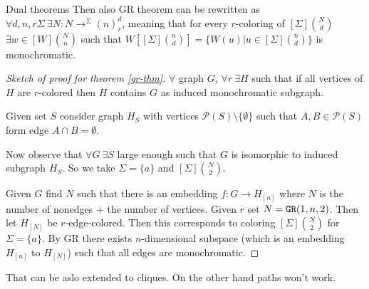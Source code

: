 \begin{topic}{Dual theorems}
	Then also GR theorem can be rewritten as $\forall d, n,r \Sigma \ \exists N : N \to^{\Sigma} (n)_r^d$, meaning that for every $r$-coloring of $[\Sigma]\binom{N}{d}$ $\exists w \in [W]\binom{N}{n}$ such that $W[[\Sigma]\binom{n}{d}] = \{W(u) | u \in [\Sigma]\binom{n}{d}\}$ is monochromatic.
		
	\begin{proof}[Sketch of proof for theorem \ref{gr-thm}]
		$\forall$ graph $G$, $\forall r \ \exists H$ such that if all vertices of $H$ are $r$-colored then $H$ contains $G$ as induced monochromatic subgraph.
		
		Given set $S$ consider graph $H_S$ with vertices $\mathcal{P}(S) \setminus \{\emptyset\}$ such that $A, B \in \mathcal{P}(S)$ form edge \ifft $A \cap B = \emptyset$.
		
		Now observe that $\forall G \ \exists S$ large enough such that $G$ is isomorphic to induced subgraph $H_S$. So we take $\Sigma = \{a\}$ and $[\Sigma]\binom{N}{2}$.
		
		Given $G$ find $N$ such that there is an embedding $f : G \to H_{[n]}$ where $N$ is the number of nonedges + the number of vertices. Given $r$ set $N = \mathtt{GR}(1,n,2)$. Then let $H_{[N]}$ be $r$-edge-colored. Then this corresponds to coloring $[\Sigma]\binom{N}{2}$ for $\Sigma = \{a\}$. By GR there exists $n$-dimensional subspace (which is an embedding $H_{[n]}$ to $H_{[N]}$) such that all edges are monochromatic.
	\end{proof}

	That can be aslo extended to cliques. On the other hand paths won't work.
\end{topic}
